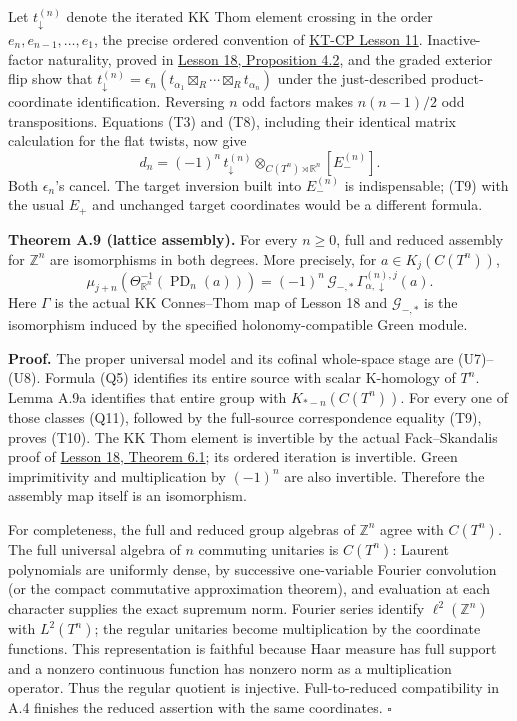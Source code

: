 \documentclass[
  11pt,
]{article}
\begin{document}
Let \(t_{\downarrow}^{(n)}\) denote the iterated KK Thom element
crossing in the order \(e_n,e_{n-1},\ldots,e_1\), the precise ordered
convention of
\href{../KT-CP/KT-CP-11.html\#iteration-in-ordered-coordinates}{KT-CP
Lesson 11}. Inactive-factor naturality, proved in
\href{KT-KK-18.html\#4-the-real-thom-operator}{Lesson 18, Proposition
4.2}, and the graded exterior flip show that
\(t_{\downarrow}^{(n)}=\epsilon_n(t_{\alpha_1}\boxtimes_R\cdots\boxtimes_Rt_{\alpha_n})\)
under the just-described product-coordinate identification. Reversing
\(n\) odd factors makes \(n(n-1)/2\) odd transpositions. Equations (T3)
and (T8), including their identical matrix calculation for the flat
twists, now give \[
 d_n=(-1)^n\,t_{\downarrow}^{(n)}
           \otimes_{C(T^n)\rtimes\mathbb R^n}[E_-^{(n)}].
 \tag{T9}
\] Both \(\epsilon_n\)'s cancel. The target inversion built into
\(E_-^{(n)}\) is indispensable; (T9) with the usual \(E_+\) and
unchanged target coordinates would be a different formula.

\textbf{Theorem A.9 (lattice assembly).} For every \(n\geq0\), full and
reduced assembly for \(\mathbb Z^n\) are isomorphisms in both degrees.
More precisely, for \(a\in K_j(C(T^n))\), \[
 \mu_{j+n}\!\left(\Theta_{\mathbb R^n}^{-1}
                       (\operatorname{PD}_n(a))\right)
     =(-1)^n\,{\mathcal G}_{-,*}\,
                         \Gamma_{\alpha,\downarrow}^{(n),j}(a).
 \tag{T10}
\] Here \(\Gamma\) is the actual KK Connes--Thom map of Lesson 18 and
\({\mathcal G}_{-,*}\) is the isomorphism induced by the specified
holonomy-compatible Green module.

\textbf{Proof.} The proper universal model and its cofinal whole-space
stage are (U7)--(U8). Formula (Q5) identifies its entire source with
scalar K-homology of \(T^n\). Lemma A.9a identifies that entire group
with \(K_{*-n}(C(T^n))\). For every one of those classes (Q11), followed
by the full-source correspondence equality (T9), proves (T10). The KK
Thom element is invertible by the actual Fack--Skandalis proof of
\href{KT-KK-18.html\#6-the-fack-skandalis-argument}{Lesson 18, Theorem
6.1}; its ordered iteration is invertible. Green imprimitivity and
multiplication by \((-1)^n\) are also invertible. Therefore the assembly
map itself is an isomorphism.

For completeness, the full and reduced group algebras of \(\mathbb Z^n\)
agree with \(C(T^n)\). The full universal algebra of \(n\) commuting
unitaries is \(C(T^n)\): Laurent polynomials are uniformly dense, by
successive one-variable Fourier convolution (or the compact commutative
approximation theorem), and evaluation at each character supplies the
exact supremum norm. Fourier series identify \(\ell^2(\mathbb Z^n)\)
with \(L^2(T^n)\); the regular unitaries become multiplication by the
coordinate functions. This representation is faithful because Haar
measure has full support and a nonzero continuous function has nonzero
norm as a multiplication operator. Thus the regular quotient is
injective. Full-to-reduced compatibility in A.4 finishes the reduced
assertion with the same coordinates. \(\square\)
\end{document}
